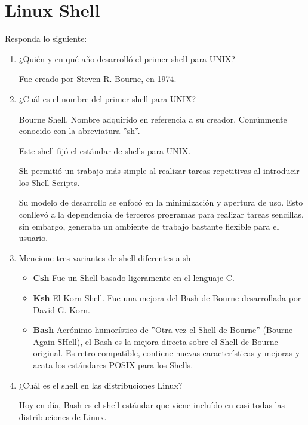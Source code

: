 \section{Linux Shell}

	Responda lo siguiente:

		\begin{enumerate}

			\item ¿Quién y en qué año desarrolló el primer shell para UNIX?
			
			Fue creado por Steven R. Bourne, en 1974.
			
			\item ¿Cuál es el nombre del primer shell para UNIX?
			
			Bourne Shell. Nombre adquirido en referencia a su creador. Comúnmente conocido con la abreviatura ''sh''.
			
			Este shell fijó el estándar de shells para UNIX.
			
			Sh permitió un trabajo más simple al realizar tareas repetitivas al introducir los Shell Scripts.
			
			Su modelo de desarrollo se enfocó en la minimización y apertura de uso. Esto conllevó a la dependencia de terceros programas para realizar tareas sencillas, sin embargo, generaba un ambiente de trabajo bastante flexible para el usuario.
			
			\item Mencione tres variantes de shell diferentes a sh
			\begin{itemize}
				\item \textbf{Csh} \newline
				Fue un Shell basado ligeramente en el lenguaje C.
				\item \textbf{Ksh} \newline
				El Korn Shell. Fue una mejora del Bash de Bourne desarrollada por David G. Korn.
				\item \textbf{Bash} \newline
				Acrónimo humorístico de ''Otra vez el Shell de Bourne'' (Bourne Again SHell), el Bash es la mejora directa sobre el Shell de Bourne original. Es retro-compatible, contiene nuevas características y mejoras y acata los estándares POSIX para los Shells.
			\end{itemize}
			
			\item ¿Cuál es el shell en las distribuciones Linux?
			
			Hoy en día, Bash es el shell estándar que viene incluído en casi todas las distribuciones de Linux.
			

\end{enumerate}
